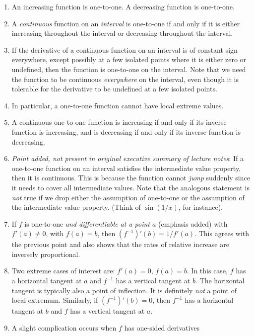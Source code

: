 \documentclass[10pt]{amsart}
\begin{document}
\begin{enumerate}

\item An increasing function is one-to-one. A decreasing function is
  one-to-one.
\item A {\em continuous} function on an {\em interval} is one-to-one
  if and only if it is either increasing throughout the interval or
  decreasing throughout the interval.
\item If the derivative of a continuous function on an interval is of
  constant sign everywhere, except possibly at a few isolated points
  where it is either zero or undefined, then the function is
  one-to-one on the interval. Note that we need the function to be
  continuous {\em everywhere} on the interval, even though it is
  tolerable for the derivative to be undefined at a few isolated
  points.
\item In particular, a one-to-one function cannot have local extreme
  values.
\item A continuous one-to-one function is increasing if and only if
  its inverse function is increasing, and is decreasing if and only if
  its inverse function is decreasing.
\item {\em Point added, not present in original executive summary of
  lecture notes}: If a one-to-one function on an interval satisfies
  the intermediate value property, then it is continuous. This is
  because the function cannot {\em jump} suddenly since it needs to
  cover all intermediate values. Note that the analogous statement is
  {\em not} true if we drop either the assumption of one-to-one or the
  assumption of the intermediate value property. (Think of
  $\sin(1/x)$, for instance).
\item If $f$ is one-to-one {\em and differentiable at a point $a$}
  (emphasis added) with $f'(a) \ne 0$, with $f(a) = b$, then
  $(f^{-1})'(b) = 1/f'(a)$. This agrees with the previous point and
  also shows that the rates of relative increase are inversely
  proportional.
\item Two extreme cases of interest are: $f'(a) = 0$, $f(a) = b$. In
  this case, $f$ has a horizontal tangent at $a$ and $f^{-1}$ has a
  vertical tangent at $b$. The horizontal tangent is typically also a
  point of inflection. It is definitely {\em not} a point of local
  extremum. Similarly, if $(f^{-1})'(b) = 0$, then $f^{-1}$ has a
  horizontal tangent at $b$ and $f$ has a vertical tangent at $a$.
\item A slight complication occurs when $f$ has one-sided derivatives

\end{enumerate}
\end{document}
